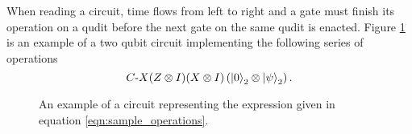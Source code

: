 When reading a circuit, time flows from left to right and a gate must finish its operation on a qudit before the next gate on the same qudit is enacted. Figure \ref{fig:sample_circuit} is an example of a two qubit circuit implementing the following series of operations
\begin{equation}
    C\text{-}X(Z\otimes I)(X\otimes I)\left(\ket{0}_2\otimes\ket{\psi}_2\right).
    \label{eqn:sample_operations}
\end{equation}
\begin{figure}[h]
    \begin{center}
    \caption{An example of a circuit representing the expression given in equation \ref{eqn:sample_operations}.}
    \label{fig:sample_circuit}
    \end{center}
\end{figure}
